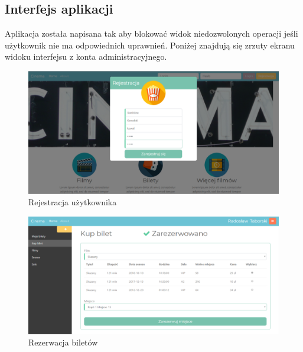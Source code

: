 \lssetdef




\subsection{Interfejs aplikacji}

Aplikacja została napisana tak aby blokować widok niedozwolonych operacji jeśli użytkownik nie ma odpowiednich uprawnień. Poniżej znajdują się zrzuty ekranu widoku interfejsu z konta administracyjnego. 

\begin{figure} [H]
	\centering
	\includegraphics[width=1\linewidth]{rozdzial05/interfejs/rejestracja.png}
	\caption{Rejestracja użytkownika}
	\label{fig:schem}
\end{figure}


\begin{figure} [H]
	\centering
	\includegraphics[width=1\linewidth]{rozdzial05/interfejs/kupBilet.png}
	\caption{Rezerwacja biletów}
	\label{fig:schem}
\end{figure}

